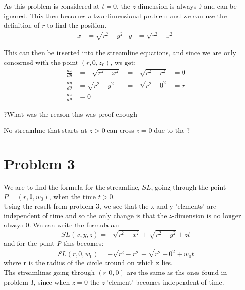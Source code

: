\documentclass[11pt,a4paper,english]{article}
\numberwithin{equation}{section}
\begin{document}
As this problem is considered at $t=0$, the $z$ dimension is always 0 and can be ignored.
This then becomes a two dimensional problem and we can use the definition of $r$ to find the position.
\begin{align*}
x &= \sqrt{r^2 - y^2}	& 
y &= \sqrt{r^2 - x^2}
\end{align*}

This can then be inserted into the streamline equations, and since we are only concerned with the point $(r, 0, z_{0})$, we get:
\begin{align*}
	\frac{dx}{d\theta} &= -\sqrt{r^2 - x^2} &= -\sqrt{r^2 - r^2} &= 0 	\\
	\frac{dy}{d\theta} &=  \sqrt{r^2 - y^2} &= -\sqrt{r^2 - 0^2} &= r	\\
	\frac{dz}{d\theta} &=  0
\end{align*}

?What was the reason this was proof enough!

No streamline that starts at $z > 0$ can cross $z = 0$ due to the ?

\section{Problem 3}
We are to find the formula for the streamline, $SL$, going through the point $P = (r, 0, w_{0})$, when the time $t > 0$. \\
Using the result from problem 3, we see that the x and y 'elements' are independent of time and so the only change is that the $z$-dimension is no longer always 0. 
We can write the formula as:
$$ SL(x, y, z) = -\sqrt{r^2 - x^2} + \sqrt{r^2 - y^2} + zt$$
and for the point $P$ this becomes:
$$ SL(r, 0, w_{0}) = -\sqrt{r^2 - r^2} + \sqrt{r^2 - 0^2} + w_{0}t$$
where r is the radius of the circle around on which z lies.
\\
The streamlines going through $(r, 0, 0)$ are the same as the ones found in problem 3, since when $z=0$ the $z$ 'element' becomes independent of time.
\end{document}
